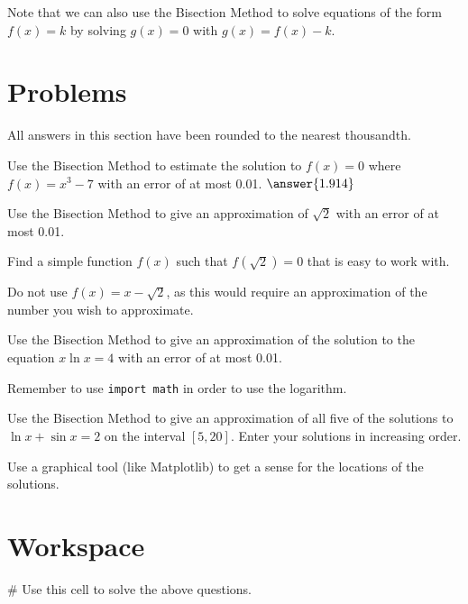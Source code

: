 \documentclass{ximera}
\begin{document}
Note that we can also use the Bisection Method to solve equations of the form $f(x)=k$ by solving $g(x)=0$ with $g(x)=f(x)-k$.

\section{Problems}

All answers in this section have been rounded to the nearest thousandth.

\begin{question}
	Use the Bisection Method to estimate the solution to $f(x)=0$ where $f(x)=x^3-7$ with an error of at most 0.01. $\answer{1.914}$ 
\end{question}

\begin{question}
	Use the Bisection Method to give an approximation of $\sqrt{2}$ with an error of at most 0.01.
	\begin{hint}
		Find a simple function $f(x)$ such that $f(\sqrt{2})=0$ that is easy to work with.
	\end{hint}
	\begin{hint}
		Do not use $f(x)=x-\sqrt{2}$, as this would require an approximation of the number you wish to approximate.
	\end{hint}
\end{question}

\begin{question}
	Use the Bisection Method to give an approximation of the solution to the equation $x\ln{x}=4$ with an error of at most 0.01.
	\begin{hint}
		Remember to use \verb|import math| in order to use the logarithm.
	\end{hint}
\end{question}

\begin{question}
	Use the Bisection Method to give an approximation of all five of the solutions to $\ln{x}+\sin{x}=2$ on the interval $[5,20]$. Enter your solutions in increasing order.
	\begin{hint}
		Use a graphical tool (like Matplotlib) to get a sense for the locations of the solutions.
	\end{hint}
\end{question}

\section{Workspace}

\begin{sageCell}
# Use this cell to solve the above questions.
\end{sageCell}
\end{document}
